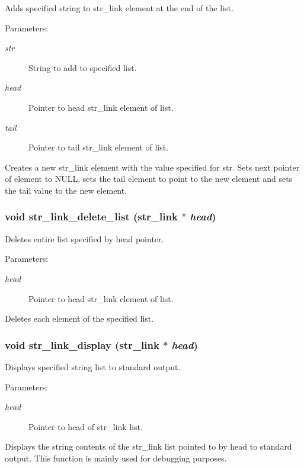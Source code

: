 Adds specified string to str\_\-link element at the end of the list.

\begin{Desc}
\item[Parameters: ]\par
\begin{description}
\item[{\em 
str}]String to add to specified list. \item[{\em 
head}]Pointer to head str\_\-link element of list. \item[{\em 
tail}]Pointer to tail str\_\-link element of list.\end{description}
\end{Desc}
Creates a new str\_\-link element with the value specified for str. Sets next pointer of element to NULL, sets the tail element to point to the new element and sets the tail value to the new element. 
\subsubsection{\setlength{\rightskip}{0pt plus 5cm}void str\_\-link\_\-delete\_\-list ({\bf str\_\-link} $\ast$ {\em head})}\label{link_8c_a18}


Deletes entire list specified by head pointer.

\begin{Desc}
\item[Parameters: ]\par
\begin{description}
\item[{\em 
head}]Pointer to head str\_\-link element of list.\end{description}
\end{Desc}
Deletes each element of the specified list. 
\subsubsection{\setlength{\rightskip}{0pt plus 5cm}void str\_\-link\_\-display ({\bf str\_\-link} $\ast$ {\em head})}\label{link_8c_a6}


Displays specified string list to standard output.

\begin{Desc}
\item[Parameters: ]\par
\begin{description}
\item[{\em 
head}]Pointer to head of str\_\-link list.\end{description}
\end{Desc}
Displays the string contents of the str\_\-link list pointed to by head to standard output. This function is mainly used for debugging purposes. 
